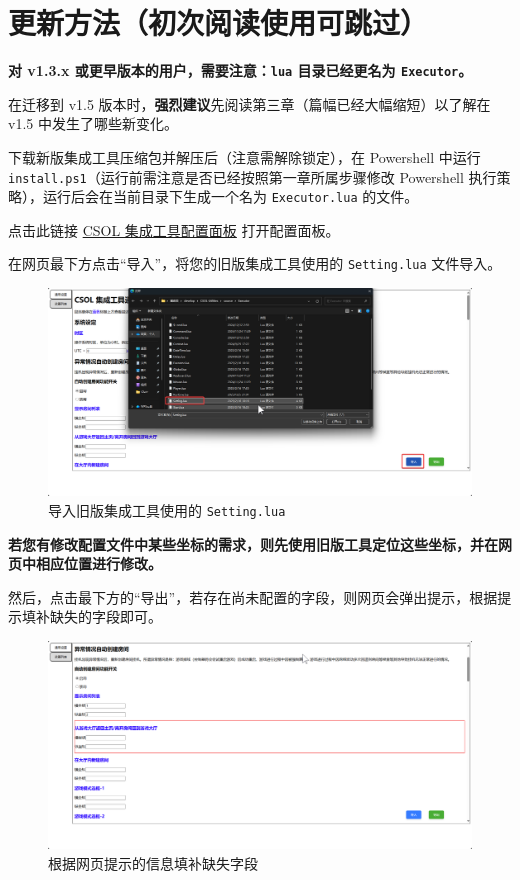 \section{更新方法（初次阅读使用可跳过）}
\label{how_to_update}

\textbf{\color{red}对 v1.3.x 或更早版本的用户，需要注意：\lstinline{lua} 目录已经更名为 \lstinline{Executor}。}

在迁移到 v1.5 版本时，\textbf{\color{red}强烈建议}先阅读第三章（篇幅已经大幅缩短）以了解在 v1.5 中发生了哪些新变化。

下载新版集成工具压缩包并解压后（注意需解除锁定），在 Powershell 中运行 \lstinline{install.ps1}（运行前需注意是否已经按照第一章所属步骤修改 Powershell 执行策略），运行后会在当前目录下生成一个名为 \lstinline{Executor.lua} 的文件。

点击此链接 \href{https://www.macrohard.fun/CSOL-Utilities/ConfigPanel}{CSOL 集成工具配置面板} 打开配置面板。

在网页最下方点击“导入”，将您的旧版集成工具使用的 \lstinline{Setting.lua} 文件导入。

\begin{figure}[H]
    \Centering
    \includegraphics[width=\textwidth]{documents/assets/import_setting}
    \caption{导入旧版集成工具使用的 \lstinline{Setting.lua}}
\end{figure}

\textbf{\color{red}若您有修改配置文件中某些坐标的需求，则先使用旧版工具定位这些坐标，并在网页中相应位置进行修改。}

然后，点击最下方的“导出”，若存在尚未配置的字段，则网页会弹出提示，根据提示填补缺失的字段即可。

\begin{figure}[H]
    \Centering
    \includegraphics[width=\textwidth]{documents/assets/export_error}
    \caption{根据网页提示的信息填补缺失字段}
\end{figure}

